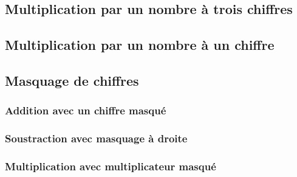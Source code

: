 \documentclass[11pt,a4paper]{article}
\begin{document}
\begin{center}
\end{center}

\subsection{Multiplication par un nombre à trois chiffres}

\begin{center}
\end{center}

\subsection{Multiplication par un nombre à un chiffre}

\begin{center}
\end{center}

\subsection{Masquage de chiffres}

\subsubsection{Addition avec un chiffre masqué}

\begin{center}
\end{center}

\subsubsection{Soustraction avec masquage à droite}

\begin{center}
\end{center}

\subsubsection{Multiplication avec multiplicateur masqué}

\begin{center}
\end{center}
\end{document}
